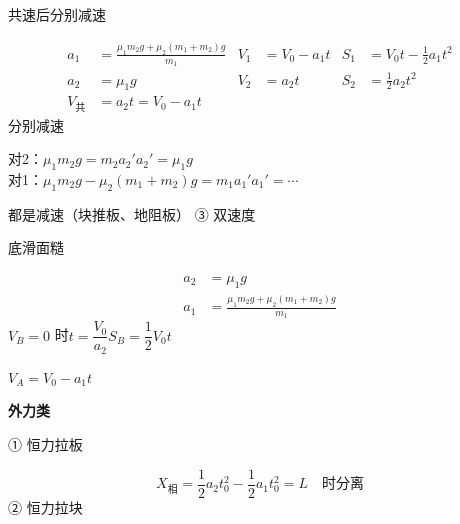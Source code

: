 \noindent 共速后分别减速

\begin{align*}
a_1&=\frac{\mu_1m_2g+\mu_2(m_1+m_2)g}{m_1} & V_1&=V_0-a_1t & S_1&=V_0t-\frac12a_1t^2\\
a_2&=\mu_1g & V_2&=a_2t & S_2&=\frac12a_2t^2\\
V_{\text{共}}&=a_2t=V_0-a_1t
\end{align*}
\noindent 分别减速

\noindent 对2：$\mu_1m_2g=m_2a_2'$\quad $a_2'=\mu_1g$\\
对1：$\mu_1m_2g-\mu_2(m_1+m_2)g=m_1a_1'$\quad $a_1'=\cdots$%

\noindent 都是减速（块推板、地阻板）%
\noindent ③ 双速度

\noindent 底滑面糙

\begin{align*}
a_2&=\mu_1g\\
a_1&=\frac{\mu_1m_2g+\mu_2(m_1+m_2)g}{m_1}
\end{align*}
\noindent $V_B=0$ 时\quad $t=\dfrac{V_0}{a_2}$\quad $S_B=\dfrac12V_0t$

\noindent $V_A=V_0-a_1t$

\textbf{外力类}

\noindent ① 恒力拉板

\[
X_{\text{相}}=\frac12a_2t_0^2-\frac12a_1t_0^2=L\quad\text{时分离}
\]
\noindent ② 恒力拉块

